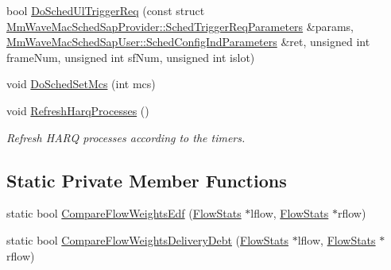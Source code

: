 \begin{DoxyCompactItemize}
\item 
bool \hyperlink{classns3_1_1MmWaveFlexTtiMaxWeightMacScheduler_a5f6cfc4ec66b6bcc47476f7829c6df6a}{Do\+Sched\+Ul\+Trigger\+Req} (const struct \hyperlink{structns3_1_1MmWaveMacSchedSapProvider_1_1SchedTriggerReqParameters}{Mm\+Wave\+Mac\+Sched\+Sap\+Provider\+::\+Sched\+Trigger\+Req\+Parameters} \&params, \hyperlink{structns3_1_1MmWaveMacSchedSapUser_1_1SchedConfigIndParameters}{Mm\+Wave\+Mac\+Sched\+Sap\+User\+::\+Sched\+Config\+Ind\+Parameters} \&ret, unsigned int frame\+Num, unsigned int sf\+Num, unsigned int islot)
\item 
void \hyperlink{classns3_1_1MmWaveFlexTtiMaxWeightMacScheduler_a4c68b3c474cb9644bdcb6e6b1fe5276f}{Do\+Sched\+Set\+Mcs} (int mcs)
\item 
void \hyperlink{classns3_1_1MmWaveFlexTtiMaxWeightMacScheduler_a602bb8621045102ce91b417d975278b7}{Refresh\+Harq\+Processes} ()
\begin{DoxyCompactList}\small\item\em Refresh H\+A\+RQ processes according to the timers. \end{DoxyCompactList}\end{DoxyCompactItemize}
\subsection*{Static Private Member Functions}
\begin{DoxyCompactItemize}
\item 
static bool \hyperlink{classns3_1_1MmWaveFlexTtiMaxWeightMacScheduler_a68278967ed08dca5c7850e9b879d3c66}{Compare\+Flow\+Weights\+Edf} (\hyperlink{structns3_1_1MmWaveFlexTtiMaxWeightMacScheduler_1_1FlowStats}{Flow\+Stats} $\ast$lflow, \hyperlink{structns3_1_1MmWaveFlexTtiMaxWeightMacScheduler_1_1FlowStats}{Flow\+Stats} $\ast$rflow)
\item 
static bool \hyperlink{classns3_1_1MmWaveFlexTtiMaxWeightMacScheduler_aa8b4f0a0d8636f03b345656436a269c3}{Compare\+Flow\+Weights\+Delivery\+Debt} (\hyperlink{structns3_1_1MmWaveFlexTtiMaxWeightMacScheduler_1_1FlowStats}{Flow\+Stats} $\ast$lflow, \hyperlink{structns3_1_1MmWaveFlexTtiMaxWeightMacScheduler_1_1FlowStats}{Flow\+Stats} $\ast$rflow)
\end{DoxyCompactItemize}
